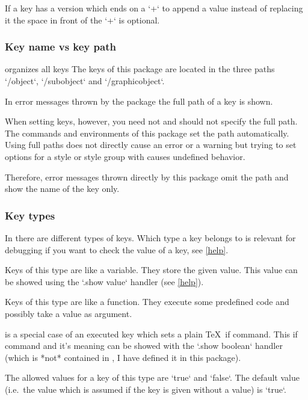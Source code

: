 If a key has a version which ends on a `+` to append a value instead of replacing it the space in front of the `+` is optional.

\subsubsection{Key name vs key path}
\label{key-name-vs-key-path}

 organizes all keys 
The keys of this package are located in the three paths `/object`, `/subobject` and `/graphicobject`.

In error messages thrown by the  package the full path of a key is shown.

When setting keys, however, you need not and should not specify the full path.
The commands and environments of this package set the path automatically.
Using full paths does not directly cause an error or a warning but trying to set options for a style or style group with \cmd{\objectset} causes undefined behavior.

Therefore, error messages thrown directly by this package omit the path and show the name of the key only.

\subsubsection{Key types}
\label{key-types}

In  there are different types of keys.
Which type a key belongs to is relevant for debugging if you want to check the value of a key, see \cref{help}.

  Keys of this type are like a variable.
  They store the given value.
  This value can be showed using the `.show value` handler (see \cref{help}).

  Keys of this type are like a function.
  They execute some predefined code and possibly take a value as argument.

  is a special case of an executed key which sets a plain \TeX\ if command.
  This if command and it's meaning can be showed with the `.show boolean` handler (which is *not* contained in , I have defined it in this package).

  The allowed values for a key of this type are `true` and `false`.
  The default value (i.e.\ the value which is assumed if the key is given without a value) is `true`.

